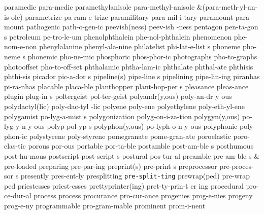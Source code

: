 \1 paramedic		para-medic
\1 paramethylanisole	para-methyl-anisole
\tabalign		&\null\quad (para-meth-yl-an-is-ole)\cr
\1 parametrize		pa-ram-e-trize
\1 paramilitary 	para-mil-i-tary
\1 paramount		para-mount
\1 pathogenic		path-o-gen-ic
\2 peevish(ness)	peev-ish -ness
\5 pentagon		pen-ta-gon s
\1 petroleum		pe-tro-le-um
\NewWordtrue
\1 phenolphthalein	phe-nol-phthalein	%
\1 phenomenon		phe-nom-e-non
\1 phenylalanine 	phenyl-ala-nine		%
\5 philatelist		phi-lat-e-list s
\5 phoneme		pho-neme s              %
\1 phonemic		pho-ne-mic
\1 phosphoric		phos-phor-ic
\1 photographs		pho-to-graphs        %
\1 photooffset		pho-to-off-set  	%
\NewWordtrue
\1 phthalamic		phtha-lam-ic		%
\NewWordtrue
\1 phthalate		phthal-ate		%
\NewWordtrue
\1 phthisis		phthi-sis		%
\5 picador		pic-a-dor s
\2 pipeline(s)		pipe-line s	%
\1 pipelining		pipe-lin-ing		%
\1 piranhas		pi-ra-nhas
\1 placable		placa-ble
\5 planthopper		plant-hop-per s	%
\1 pleasance		pleas-ance
\5 plugin		plug-in s	%
\1 poltergeist		pol-ter-geist
\NewWordtrue
\2 polyandr(y,ous)	poly-an-dr y ous	%
\NewWordtrue
\2 polydactyl(lic)	poly-dac-tyl -lic	%
\1 polyene		poly-ene
\1 polyethylene		poly-eth-yl-ene
\5 polygamist		po-lyg-a-mist s
\1 polygonization	polyg-on-i-za-tion
\NewWordtrue
\2 polygyn(y,ous)	po-lyg-y-n y ous	%
\NewWordtrue
\5 polyp		pol-yp s
\2 polyphon(y,ous)	po-lyph-o-n y ous
\NewWordtrue
\1 polyphonic		poly-phon-ic		%
\1 polystyrene		poly-styrene
\1 pomegranate		pome-gran-ate
\1 poroelastic		poro-elas-tic
\1 porous		por-ous
\1 portable		por-ta-ble		%
\5 postamble		post-am-ble s
\1 posthumous		post-hu-mous	%
\5 postscript		post-script s
\1 postural		pos-tur-al
\5 preamble		pre-am-ble s
 & pre-loaded \cr
\1 preparing		pre-par-ing
\2 preprint(s)		pre-print s
\5 preprocessor		pre-proces-sor s
\NewWordtrue
\1 presently		pres-ent-ly		%
\1 presplitting 	{\tt\bs pre-split-ting}
\2 prewrap(ped)		pre-wrap ped		%
\1 priestesses		priest-esses
\3 prettyprinter(ing)	pret-ty-prin-t er ing
\1 procedural		pro-ce-dur-al
\1 process		process\thinspace*
\1 procurance		pro-cur-ance
\1 progenies		prog-e-nies
\1 progeny		prog-e-ny
\1 programmable		pro-gram-mable		%
\1 prominent		prom-i-nent		%
